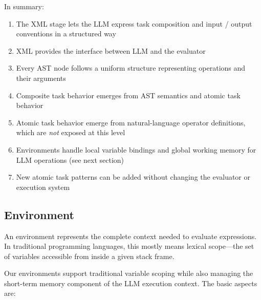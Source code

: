 \documentclass{article}
\begin{document}

In summary:
\begin{enumerate}
    \item The XML stage lets the LLM express task composition and input / output conventions in a structured way
    \item XML provides the interface between LLM and the evaluator
    \item Every AST node follows a uniform structure representing operations and their arguments
    \item Composite task behavior emerges from AST semantics and atomic task behavior
    \item Atomic task behavior emerge from natural-language operator definitions, which are \emph{not} exposed at this level
    \item Environments handle local variable bindings and global working memory for LLM operations (see next section)
    \item New atomic task patterns can be added without changing the evaluator or execution system
\end{enumerate}



\subsection{Environment}

An environment represents the complete context needed to evaluate expressions. In traditional programming languages, this mostly means lexical scope---the set of variables accessible from inside a given stack frame. %


Our environments support traditional variable scoping while also managing the short-term memory component of the LLM execution context. The basic aspects are:
\end{document}
